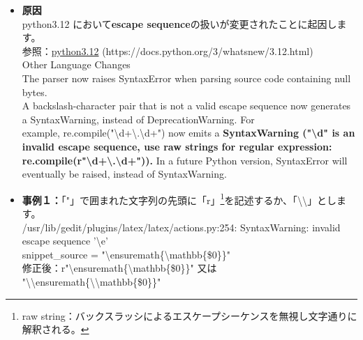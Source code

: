 \documentclass[a4paper,10pt,titlepage,pdfusetitle]{ltjsarticle}
\def\colH#1{\color[HTML]{#1}}
\def\fs#1#2{\fontsize{#1}{#2}\selectfont }
\def\bs{\textbackslash}
\begin{document}
{\begin{itemize}
{\begin{verbatim}
/usr/share/scribus/scripts/importcsv2table.py:3: SyntaxWarning: invalid escape sequence '\o'
  """
running python post-rtupdate hooks for python3.12...
\end{verbatim}
}
  \item[]\textbf{原因}\\
python3.12 において\textbf{escape sequence}の扱いが変更されたことに起因します。\\
\hspace{4mm}参照：\href{https://docs.python.org/3/whatsnew/3.12.html}{python3.12} (https://docs.python.org/3/whatsnew/3.12.html)\\
{\fs{8pt}{8}
Other Language Changes\\
    The parser now raises SyntaxError when parsing source code containing null bytes.\\
    A backslash-character pair that is not a valid escape sequence now generates a SyntaxWarning, instead of DeprecationWarning. For \\example, re.compile("\bs d+\bs .\bs d+") now emits a \textbf{SyntaxWarning ("\bs d" is an invalid escape sequence, use raw strings for regular expression: re.compile(r"\bs d+\bs .\bs d+")).} In a future Python version, SyntaxError will eventually be raised, instead of SyntaxWarning.
}\vspace{2mm}

\newpage

  \item[]\textbf{事例１：}「"」で囲まれた文字列の先頭に「{\colH{800000}r}」\footnote{raw string：バックスラッシによるエスケープシーケンスを無視し文字通りに解釈される。}を記述するか、「{\colH{800000}\bs\bs}」とします。\\
\hspace{6mm}/usr/lib/gedit/plugins/latex/latex/actions.py:254: SyntaxWarning: invalid escape sequence '\bs e'\\
\hspace{8mm}snippet\_source = "\bs ensuremath\{\bs mathbb\{\$0\}\}"\\
\hspace{8mm}修正後：{\colH{800000}r}"\bs ensuremath\{\bs mathbb\{\$0\}\}" 又は "{\colH{800000}\bs\bs}ensuremath\{{\colH{800000}\bs\bs}mathbb\{\$0\}\}"\\


\end{itemize}}
\end{document}
